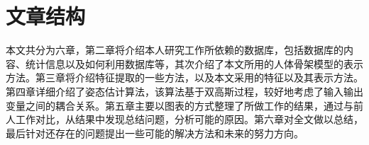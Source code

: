 \section{文章结构}
本文共分为六章，第二章将介绍本人研究工作所依赖的数据库，包括数据库的内容、统计信息以及如何利用数据库等，其次介绍了本文所用的人体骨架模型的表示方法。第三章将介绍特征提取的一些方法，以及本文采用的特征以及其表示方法。第四章详细介绍了姿态估计算法，该算法基于双高斯过程，较好地考虑了输入输出变量之间的耦合关系。第五章主要以图表的方式整理了所做工作的结果，通过与前人工作对比，从结果中发现总结问题，分析可能的原因。第六章对全文做以总结，最后针对还存在的问题提出一些可能的解决方法和未来的努力方向。
